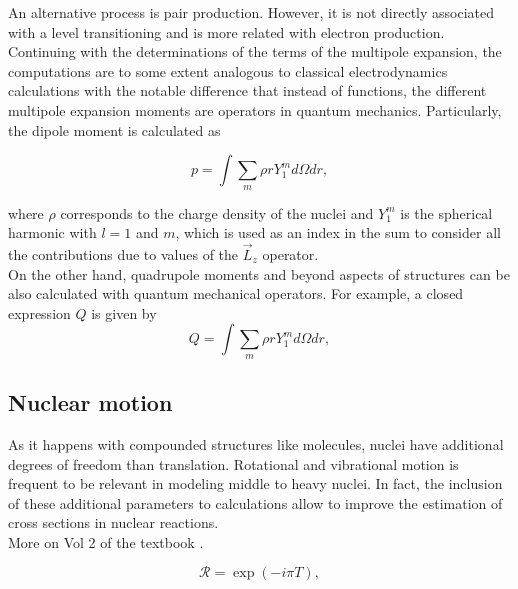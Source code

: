 \documentclass[openany]{book}
\begin{document}
An alternative process is pair production. However, it is not directly associated with a level transitioning and is more related with electron production.  \\

Continuing with the determinations of the terms of the multipole expansion, the computations are to some extent analogous to classical electrodynamics calculations with the notable difference that instead of functions, the different multipole expansion moments are operators in quantum mechanics. Particularly, the dipole moment is calculated as

\begin{equation}\label{eq:nuclearTransitions_dipole}
	p = \int  \sum_m {\rho r Y^{m}_1 } d\Omega dr, 
\end{equation}

where $\rho$ corresponds to the charge density of the nuclei and $Y^{m}_1$ is the spherical harmonic with $l =1$ and $m$, which is used as an index in the sum to consider all the contributions due to values of the $\vec L_z$ operator. \\

On the other hand, quadrupole moments and beyond aspects of structures can be also calculated with quantum mechanical operators. For example, a closed expression $Q$ is given by \\

\begin{equation}\label{eq:nuclearTransitions_quadrupole}
	Q = \int  \sum_m {\rho r Y^{m}_1 } d\Omega dr, 
\end{equation}

\subsection{Nuclear motion}  \label{sub:nuclearMotion}

As it happens with compounded structures like molecules, nuclei have additional degrees of freedom than translation. Rotational and vibrational motion is frequent to be relevant in modeling middle to heavy nuclei. In fact, the inclusion of these additional parameters to calculations allow to improve the estimation of cross sections in nuclear reactions.  \\

More on Vol 2 of the textbook \cite{bohr_mottelson_1998}.


\begin{equation}\label{eq:nuclearMotion_generator }
	\mathcal{R} = \exp(-i \pi T),
\end{equation}
\end{document}
